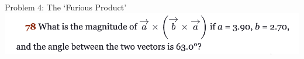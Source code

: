   \begin{frame}{Problem 4: The `Furious Product'}
\small
\includegraphics[scale=0.5]{furious}\\[18ex]

\end{frame}
%
%



 
